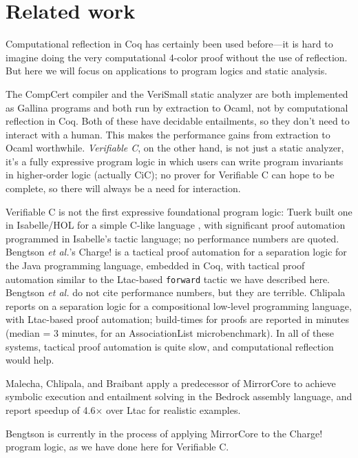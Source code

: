 \documentclass{puthesis}
\begin{document}
\section{Related work}
Computational reflection in Coq has certainly been used before---it is
hard to imagine doing the very computational 4-color proof
\cite{gonthier2008formal} without the use of reflection.  But here we
will focus on applications to program logics and static analysis.

The CompCert compiler \cite{leroy09} and the VeriSmall static analyzer
\cite{appel11:cpp} are both implemented as Gallina programs and both
run by extraction to Ocaml, not by computational reflection in Coq.
Both of these have decidable entailments, so they don't need to
interact with a human. This makes the performance gains from
extraction to Ocaml worthwhile. \emph{Verifiable C}, on the other
hand, is not just a static analyzer, it's a fully expressive program
logic in which users can write program invariants in higher-order
logic (actually CiC); no prover for Verifiable C can hope to be
complete, so there will always be a need for interaction.

Verifiable C is not the first expressive foundational program logic:
Tuerk built one in Isabelle/HOL for a simple C-like language
\cite{Tuer09}, with significant proof automation programmed in
Isabelle's tactic language; no performance numbers are quoted.
Bengtson \emph{et al.}'s Charge! \cite{bengtson12:Charge} is a
tactical proof automation for a separation logic for the Java
programming language, embedded in Coq, with tactical proof automation
similar to the Ltac-based \lstinline{forward} tactic we have described
here.  Bengtson \emph{et al.} do not cite performance numbers, but
they are terrible.  Chlipala \cite{chlipala11:pldi} reports on a
separation logic for a compositional low-level programming language,
with Ltac-based proof automation; build-times for proofs are reported
in minutes (median = 3 minutes, for an AssociationList
microbenchmark).  In all of these systems, tactical proof automation
is quite slow, and computational reflection would help.

Malecha, Chlipala, and Braibant \cite{malecha2014compositional} apply a
predecessor of MirrorCore to achieve symbolic execution and entailment
solving in the Bedrock assembly language, and report speedup of
4.6$\times$ over Ltac for realistic examples. 

Bengtson is currently in the process of applying
MirrorCore to the Charge! program logic, as we have done here
for Verifiable C.
\end{document}
